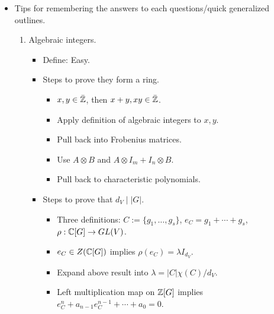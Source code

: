 \documentclass[../notes.tex]{subfiles}
\begin{document}
\begin{itemize}
\begin{proof}[Answer]
\begin{align*}
            &= \frac{1}{|H|\cdot|G|}\cdot|G|\sum_{g_1\in G}\chi_V(g_2^{-1}g_1g_2)\chi_W(g_2^{-1}g_1^{-1}g_2)\\
            &= \frac{1}{|H|}\sum_{h\in G}\chi_V(h)\chi_W(h^{-1})\\
            &= \frac{1}{|H|}\sum_{h\in H}\chi_V(h)\chi_W(h^{-1})\\
            &= \frac{1}{|H|}\sum_{h\in H}\chi_V(h)\overline{\chi_W(h)}\\
            &= (\chi_V|_H,\chi_W)_H\\
            &= (\chi_{\res_H^GV},\chi_W)_H
        \end{align*}
        Note that we can expand the second summation to be over all $g_2\in G$ by defining $\chi_W$ to be zero whenever its argument $g_2^{-1}g_1^{-1}g_2\notin H$.
    \end{proof}
    \item Tips for remembering the answers to each questions/quick generalized outlines.
    \begin{enumerate}
        \item Algebraic integers.
        \begin{itemize}
            \item Define: Easy.
            \item Steps to prove they form a ring.
            \begin{itemize}
                \item $x,y\in\bar{\mathbb{Z}}$, then $x+y,xy\in\bar{\mathbb{Z}}$.
                \item Apply definition of algebraic integers to $x,y$.
                \item Pull back into Frobenius matrices.
                \item Use $A\otimes B$ and $A\otimes I_m+I_n\otimes B$.
                \item Pull back to characteristic polynomials.
            \end{itemize}
            \item Steps to prove that $d_V\mid|G|$.
            \begin{itemize}
                \item Three definitions: $C:=\{g_1,\dots,g_s\}$, $e_C=g_1+\cdots+g_s$, $\rho:\mathbb{C}[G]\to GL(V)$.
                \item $e_C\in Z(\mathbb{C}[G])$ implies $\rho(e_C)=\lambda I_{d_V}$.
                \item Expand above result into $\lambda=|C|\chi(C)/d_V$.
                \item Left multiplication map on $\mathbb{Z}[G]$ implies $e_C^n+a_{n-1}e_C^{n-1}+\cdots+a_0=0$.

\end{itemize}
\end{itemize}
\end{enumerate}
\end{itemize}
\end{document}
